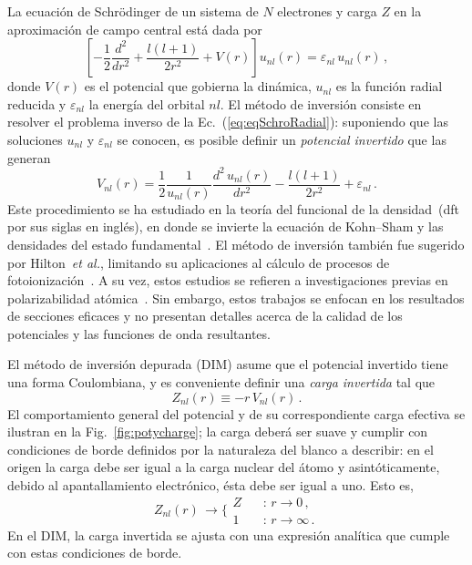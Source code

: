 La ecuación de Schr\"odinger de un sistema de $N$ electrones y carga $Z$ 
en la aproximación de campo central está dada por
\begin{equation}
 \left[ -\frac{1}{2}\frac{d^2}{dr^2} + \frac{l(l+1)}{2r^2} +
 V(r) \right] u_{nl}(r) = \varepsilon_{nl} \, u_{nl}(r)\,,
\label{eq:eqSchroRadial}
\end{equation}
donde $V(r)$ es el potencial que gobierna la dinámica, $u_{nl}$ es la 
función radial reducida y $\varepsilon_{nl}$ la energía del orbital 
$nl$. 
El método de inversión consiste en resolver el problema inverso de la 
Ec.~(\ref{eq:eqSchroRadial}): suponiendo que las soluciones $u_{nl}$ y 
$\varepsilon_{nl}$ se conocen, es posible definir un \textit{potencial 
invertido} que las generan
\begin{equation}
V_{nl}(r) = 
\frac{1}{2}\frac{1}{u_{nl}(r)} \frac{d^2\,u_{nl}(r)}{dr^{2}} - 
\frac{l(l+1)}{2r^{2}}+\varepsilon_{nl} \,.
\label{eq:Vinv}
\end{equation}
Este procedimiento se ha estudiado en la teoría del funcional de la 
densidad~(\acs{dft} por sus siglas en inglés), en donde se invierte la
ecuación de Kohn--Sham y las densidades del estado 
fundamental~\cite{Wu:03,Gaiduk:13,Ryabinkin:15,Schipper:97,deSilva:12,
Kananenka:13,Jacob:11}. El método de inversión también fue sugerido por 
Hilton~\textit{et al.}, limitando su aplicaciones al cálculo de procesos 
de fotoionización~\cite{Hilton:77,
Suzer:77,Hilton:79,Hilton:80,Crljen:87}. A su vez, estos estudios se 
refieren a investigaciones previas en polarizabilidad 
atómica~\cite{Sternheimer:54,Dalgarno:59}. Sin embargo, estos trabajos 
se enfocan en los resultados de secciones eficaces y no presentan 
detalles acerca de la calidad de los potenciales y las funciones de onda 
resultantes. 

El método de inversión depurada (DIM) asume que el potencial invertido 
tiene una forma Coulombiana, y es conveniente definir una \textit{carga 
invertida} tal que
\begin{equation}
Z_{nl}(r) \equiv -r \, V_{nl}(r) \,.
\label{eq:Zinv}
\end{equation}
El comportamiento general del potencial y de su correspondiente carga 
efectiva se ilustran en la Fig.~\ref{fig:potycharge}; la carga deberá 
ser suave y cumplir con condiciones de borde definidos por la naturaleza 
del blanco a describir: 
en el origen la carga debe ser igual a la carga nuclear del átomo y 
asintóticamente, debido al apantallamiento electrónico, ésta debe ser
igual a uno. Esto es,
\begin{equation}
Z_{nl}(r) \, \rightarrow 
\bigg\{ 
\begin{array}{ll}
Z  \ \  & \ \ \text{:\ \ }r  \rightarrow 0 \,, \\ 
1           & \ \ \text{:\ \ }r  \rightarrow \infty \,.
\end{array}
\label{eq:Zasympt}
\end{equation} 
En el DIM, la carga invertida se ajusta con una expresión analítica que 
cumple con estas condiciones de borde.

